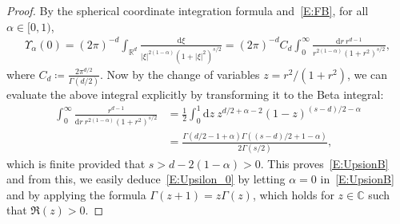 \documentclass[sn-mathphys]{sn-jnl}%
\renewcommand{\R}{\mathbb{R}}
\newcommand{\ud}{\ensuremath{\mathrm{d}}}
\numberwithin{equation}{section}
\theoremstyle{thmstyleone}%
\theoremstyle{thmstyletwo}%
\theoremstyle{thmstylethree}%
\begin{document}
\begin{proof}
  By the spherical coordinate integration formula and~\eqref{E:FB}, for all $\alpha\in[0,1)$,
  \begin{align*}
    \Upsilon_\alpha(0) = \left(2\pi\right)^{-d} \int_{\R^d} \frac{\ud\xi}{\lvert\xi\rvert^{2(1-\alpha)}\left(1+\lvert\xi\rvert^2\right)^{s/2}}
    = \left(2\pi\right)^{-d} C_d \int_0^\infty \frac{ \ud r\: r^{d-1}}{r^{2(1-\alpha)}\left(1+r^2\right)^{s/2}},
  \end{align*}
  where $C_d\coloneqq \frac{2\pi^{d/2}}{\Gamma\left(d/2\right)}$. Now by the change of variables
  $z = r^2 /(1+r^2)$, we can evaluate the above integral explicitly by transforming it to the Beta
  integral:
  \begin{align*}
    \int_0^\infty \frac{r^{d-1}}{\ud r\: r^{2(1-\alpha)}\left(1+r^2\right)^{s/2}}
     & = \frac{1}{2} \int_0^1 \ud z\: z^{d/2+\alpha-2}(1-z)^{(s-d)/2-\alpha} \\
     & = \frac{\Gamma\left(d/2-1+\alpha\right)\Gamma\left((s-d)/2+1-\alpha\right)}{2\Gamma(s/2)},
  \end{align*}
  which is finite provided that $s>d-2(1-\alpha)>0$. This proves~\eqref{E:UpsionB} and from this, we
  easily deduce~\eqref{E:Upsilon_0} by letting $\alpha = 0$ in~\eqref{E:UpsionB} and by applying the
  formula $\Gamma(z+1) = z\Gamma(z)$, which holds for $z\in \mathbb{C}$ such that $\Re(z)>0$.


\end{proof}
\end{document}
